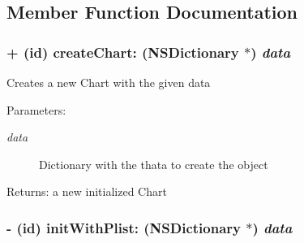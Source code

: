 \subsection{Member Function Documentation}
\hypertarget{protocol_t_p_chart_serialization_property_list_dictionary-p_be3a5d2f8864a8d2cae2f98322ae9c62}{
\subsubsection[{createChart:}]{\setlength{\rightskip}{0pt plus 5cm}+ (id) createChart: (NSDictionary $\ast$) {\em data}}}
\label{protocol_t_p_chart_serialization_property_list_dictionary-p_be3a5d2f8864a8d2cae2f98322ae9c62}


Creates a new Chart with the given data \begin{Desc}
\item[Parameters:]
\begin{description}
\item[{\em data}]Dictionary with the thata to create the object \end{description}
\end{Desc}
\begin{Desc}
\item[Returns:]a new initialized Chart \end{Desc}
\hypertarget{protocol_t_p_chart_serialization_property_list_dictionary-p_e4bb4f36e40839798379b7457f347efd}{
\subsubsection[{initWithPlist:}]{\setlength{\rightskip}{0pt plus 5cm}- (id) initWithPlist: (NSDictionary $\ast$) {\em data}}}
\label{protocol_t_p_chart_serialization_property_list_dictionary-p_e4bb4f36e40839798379b7457f347efd}


